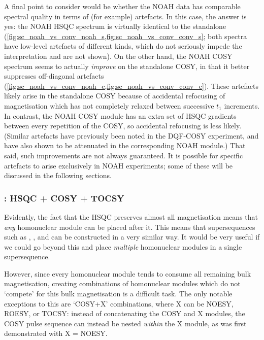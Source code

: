 A final point to consider would be whether the NOAH data has comparable spectral quality in terms of (for example) artefacts.
In this case, the answer is yes: the NOAH HSQC spectrum is virtually identical to the standalone (\cref{fig:sc_noah_vs_conv_noah_s,fig:sc_noah_vs_conv_conv_s}; both spectra have low-level artefacts of different kinds, which do not seriously impede the interpretation and are not shown).
On the other hand, the NOAH COSY spectrum seems to actually \textit{improve} on the standalone COSY, in that it better suppresses off-diagonal artefacts (\cref{fig:sc_noah_vs_conv_noah_c,fig:sc_noah_vs_conv_conv_c}).
These artefacts likely arise in the standalone COSY because of accidental refocusing of magnetisation which has not completely relaxed between successive $t_1$ increments.\autocite{Vitorge2010JMR}
In contrast, the NOAH COSY module has an extra set of HSQC gradients between every repetition of the COSY, so accidental refocusing is less likely.
(Similar artefacts have previously been noted in the DQF-COSY experiment\autocite{Shaw1996JMRSA,Howe2014MRC}, and have also shown to be attenuated in the corresponding NOAH module\autocite{Claridge2019MRC}.)
That said, such improvements are not always guaranteed.
It is possible for specific artefacts to arise exclusively in NOAH experiments; some of these will be discussed in the following sections.


\subsubsection{: HSQC + COSY + TOCSY}

Evidently, the fact that the HSQC preserves almost all  magnetisation means that \textit{any} homonuclear module can be placed after it.
This means that supersequences such as , , and  can be constructed in a very similar way.
It would be very useful if we could go beyond this and place \textit{multiple} homonuclear modules in a single supersequence.

However, since every homonuclear module tends to consume all remaining bulk magnetisation, creating combinations of homonuclear modules which do not `compete' for this bulk magnetisation is a difficult task.
The only notable exceptions to this are `COSY+X' combinations, where X can be NOESY, ROESY, or TOCSY: instead of concatenating the COSY and X modules, the COSY pulse sequence can instead be nested \textit{within} the X module, as was first demonstrated with X = NOESY\autocite{Haasnoot1984JMR,Gurevich1984JMR}.

